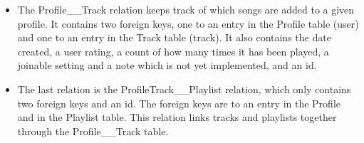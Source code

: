 \begin{itemize}
\item The Profile\_\_Track relation keeps track of which songs are added to a given profile. It contains two foreign keys, one to an entry in the Profile table (user) and one to an entry in the Track table (track). It also contains the date created, a user rating, a count of how many times it has been played, a joinable setting and a note which is not yet implemented, and an id. 

\item The last relation is the ProfileTrack\_\_Playlist relation, which only contains two foreign keys and an id. The foreign keys are to an entry in the Profile and in the Playlist table. This relation links tracks and playlists together through the Profile\_\_Track table.
\end{itemize}